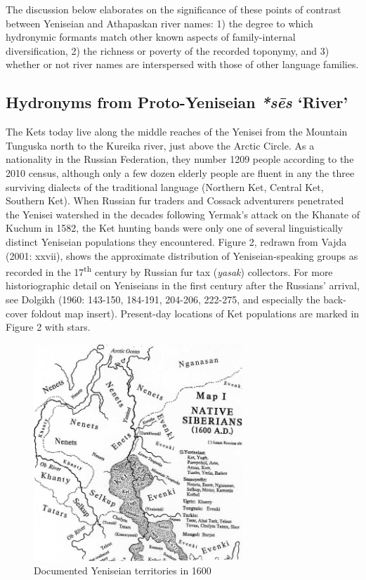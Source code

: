 The discussion below elaborates on the significance of these points of contrast between Yeniseian and Athapaskan river names: 1) the degree to which hydronymic formants match other known aspects of family-internal diversification, 2) the richness or poverty of the recorded toponymy, and 3) whether or not river names are interspersed with those of other language families.

\subsection{Hydronyms from Proto-Yeniseian \textit{*s\=es} ‘River’}

The Kets today live along the middle reaches of the Yenisei from the Mountain Tunguska north to the Kureika river, just above the Arctic Circle. As a nationality in the Russian Federation, they number 1209 people according to the 2010 census, although only a few dozen elderly people are fluent in any the three surviving dialects of the traditional language (Northern Ket, Central Ket, Southern Ket). When Russian fur traders and Cossack adventurers penetrated the Yenisei watershed in the decades following Yermak’s attack on the Khanate of Kuchum in 1582, the Ket hunting bands were only one of several linguistically distinct Yeniseian populations they encountered. Figure 2, redrawn from Vajda (2001: xxvii), shows the approximate distribution of Yeniseian-speaking groups as recorded in the 17\textsuperscript{th} century by Russian fur tax (\textit{yasak}) collectors. For more historiographic detail on Yeniseians in the first century after the Russians’ arrival, see Dolgikh (1960: 143-150, 184-191, 204-206, 222-275, and especially the back-cover foldout map insert). Present-day locations of Ket populations are marked in Figure 2 with stars.

\begin{figure}
\centering
\includegraphics[width=0.7\textwidth]{figures/vajda-fig2}
\caption{Documented Yeniseian territories in 1600}
\label{vajda-fig2}
\end{figure}


